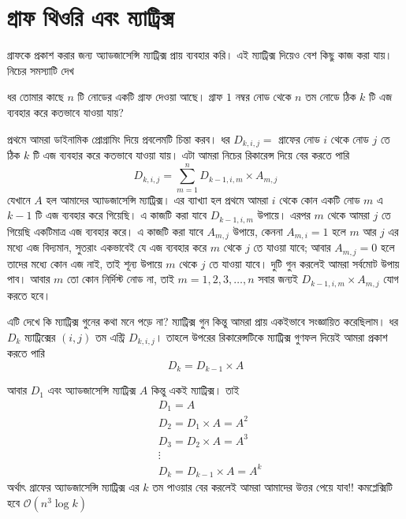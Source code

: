 \section{গ্রাফ থিওরি এবং ম্যাট্রিক্স}
গ্রাফকে প্রকাশ করার জন্য অ্যাডজাসেন্সি ম্যাট্রিক্স প্রায় ব্যবহার করি। এই ম্যাট্রিক্স দিয়েও বেশ কিছু কাজ করা যায়। নিচের সমস্যাটি দেখ
\begin{problem}
ধর তোমার কাছে $n$ টি নোডের একটি গ্রাফ দেওয়া আছে। গ্রাফ $1$ নম্বর নোড থেকে $n$ তম নোডে ঠিক $k$ টি এজ ব্যবহার করে কতভাবে যাওয়া যায়?
\end{problem}
\begin{solution}
প্রথমে আমরা ডাইনামিক প্রোগ্রামিং দিয়ে প্রবলেমটি চিন্তা করব। ধর $D_{k, i, j} = $ গ্রাফের নোড $i$ থেকে নোড $j$ তে ঠিক $k$ টি এজ ব্যবহার করে কতভাবে যাওয়া যায়।  এটা আমরা নিচের রিকারেন্স দিয়ে বের করতে পারি
$$ D_{k, i, j} = \sum_{m = 1}^{n} D_{k - 1, i, m} \times A_{m, j} $$
যেখানে $A$ হল আমাদের অ্যাডজাসেন্সি ম্যাট্রিক্স। এর ব্যাখ্যা হল প্রথমে আমরা $i$ থেকে কোন একটি নোড $m$ এ $k - 1$ টি এজ ব্যবহার করে গিয়েছি। এ কাজটি করা যাবে $D_{k - 1, i, m}$ উপায়ে। এরপর $m$ থেকে আমরা $j$ তে গিয়েছি একটিমাত্র এজ ব্যবহার করে। এ কাজটি করা যাবে $A_{m, j}$ উপায়ে, কেননা $A_{m, i} = 1$ হলে $m$ আর $j$ এর মধ্যে এজ বিদ্যমান, সুতরাং একভাবেই যে এজ ব্যবহার করে $m$ থেকে $j$ তে যাওয়া যাবে; আবার $A_{m, j} = 0$ হলে তাদের মধ্যে কোন এজ নাই, তাই শূন্য উপায়ে $m$ থেকে $j$ তে যাওয়া যাবে। দুটি গুন করলেই আমরা সর্বমোট উপায় পাব। আবার $m$ তো কোন নির্দিস্ট নোড না, তাই $m = 1, 2, 3, \dots, n$ সবার জন্যই $ D_{k - 1, i, m} \times A_{m, j} $ যোগ করতে হবে।

এটি দেখে কি ম্যাট্রিক্স গুনের কথা মনে পড়ে না? ম্যাট্রিক্স গুন কিন্তু আমরা প্রায় একইভাবে সংজ্ঞায়িত করেছিলাম। ধর $D_{k}$ ম্যাট্রিক্সের $(i, j)$ তম এন্ট্রি $D_{k, i, j}$। তাহলে উপরের রিকারেন্সটিকে ম্যাট্রিক্স গুণফল দিয়েই আমরা প্রকাশ করতে পারি
$$ D_{k} = D_{k - 1} \times A$$

আবার $D_{1}$ এবং  অ্যাডজাসেন্সি ম্যাট্রিক্স $A$ কিন্তু একই ম্যাট্রিক্স। তাই
\begin{align*}
& D_{1} = A \\
& D_{2} = D_{1} \times A = A^2 \\
& D_{3} = D_{2} \times A = A^3 \\
& \vdots \\
& D_{k} = D_{k - 1} \times A = A^k
\end{align*}
অর্থাৎ গ্রাফের  অ্যাডজাসেন্সি ম্যাট্রিক্স এর $k$ তম পাওয়ার বের করলেই আমরা আমাদের উত্তর পেয়ে যাব!! কমপ্লেক্সিটি হবে $\mathcal{O}(n^3\log{k})$
\end{solution}

